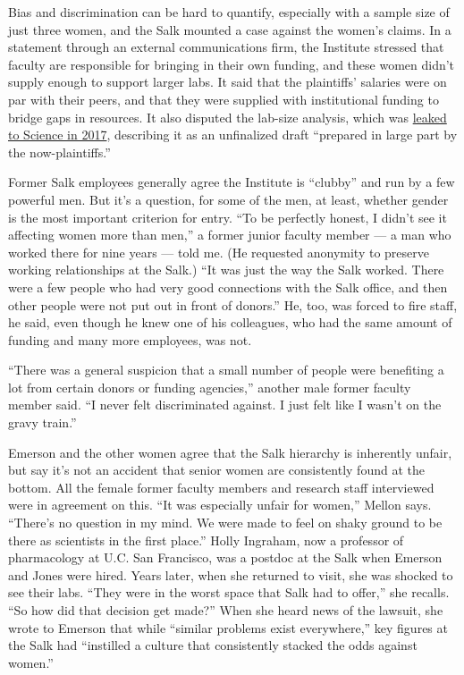 Bias and discrimination can be hard to quantify, especially with a
sample size of just three women, and the Salk mounted a case against the
women's claims. In a statement through an external communications firm,
the Institute stressed that faculty are responsible for bringing in
their own funding, and these women didn't supply enough to support
larger labs. It said that the plaintiffs' salaries were on par with
their peers, and that they were supplied with institutional funding to
bridge gaps in resources. It also disputed the lab-size analysis, which
was
\href{https://www.sciencemag.org/news/2017/08/leaked-documents-expose-long-standing-gender-tensions-salk-institute}{leaked
to Science in 2017}, describing it as an unfinalized draft ``prepared in
large part by the now-plaintiffs.''

Former Salk employees generally agree the Institute is ``clubby'' and
run by a few powerful men. But it's a question, for some of the men, at
least, whether gender is the most important criterion for entry. ``To be
perfectly honest, I didn't see it affecting women more than men,'' a
former junior faculty member --- a man who worked there for nine years
--- told me. (He requested anonymity to preserve working relationships
at the Salk.) ``It was just the way the Salk worked. There were a few
people who had very good connections with the Salk office, and then
other people were not put out in front of donors.'' He, too, was forced
to fire staff, he said, even though he knew one of his colleagues, who
had the same amount of funding and many more employees, was not.

``There was a general suspicion that a small number of people were
benefiting a lot from certain donors or funding agencies,'' another male
former faculty member said. ``I never felt discriminated against. I just
felt like I wasn't on the gravy train.''

Emerson and the other women agree that the Salk hierarchy is inherently
unfair, but say it's not an accident that senior women are consistently
found at the bottom. All the female former faculty members and research
staff interviewed were in agreement on this. ``It was especially unfair
for women,'' Mellon says. ``There's no question in my mind. We were made
to feel on shaky ground to be there as scientists in the first place.''
Holly Ingraham, now a professor of pharmacology at U.C. San Francisco,
was a postdoc at the Salk when Emerson and Jones were hired. Years
later, when she returned to visit, she was shocked to see their labs.
``They were in the worst space that Salk had to offer,'' she recalls.
``So how did that decision get made?'' When she heard news of the
lawsuit, she wrote to Emerson that while ``similar problems exist
everywhere,'' key figures at the Salk had ``instilled a culture that
consistently stacked the odds against women.''


